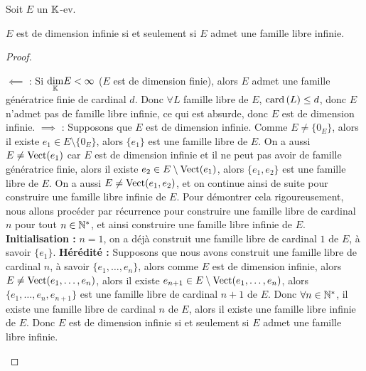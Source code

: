 \documentclass[12pt, a4paper]{report}
\begin{document}
\begin{property}
    Soit $E$ un $\mathbb{K}$-ev.

    $E$ est de dimension infinie si et seulement si $E$ admet une famille libre infinie.
\end{property}

\begin{proof}
    \begin{outline}
        \1 $\impliedby$ : Si $\underset{\mathbb{K}}\dim E < \infty$ ($E$ est de dimension finie), alors $E$ admet une famille génératrice finie de cardinal $d$. Donc $\forall L$ famille libre de $E$, $\mathrm{card}\left(L\right) \le d$, donc $E$ n'admet pas de famille libre infinie, ce qui est absurde, donc $E$ est de dimension infinie.
        \1 $\implies$ : Supposons que $E$ est de dimension infinie.
            \2 Comme $E \ne \{0_E\}$, alors il existe $e_1 \in E\setminus\{0_E\}$, alors $\{e_1\}$ est une famille libre de $E$.
            \2 On a aussi $E \ne \mathrm{Vect}(e_1)$ car $E$ est de dimension infinie et il ne peut pas avoir de famille génératrice finie, alors il existe $e_2 \in E\setminus\mathrm{Vect}(e_1)$, alors $\{e_1,e_2\}$ est une famille libre de $E$.
            \2 On a aussi $E \ne \mathrm{Vect}(e_1,e_2)$, et on continue ainsi de suite pour construire une famille libre infinie de $E$.
            \2 Pour démontrer cela rigoureusement, nous allons procéder par récurrence pour construire une famille libre de cardinal $n$ pour tout $n \in \mathbb{N}^*$, et ainsi construire une famille libre infinie de $E$.
                \3 \textbf{Initialisation :} $n=1$, on a déjà construit une famille libre de cardinal $1$ de $E$, à savoir $\{e_1\}$.
                \3 \textbf{Hérédité :} Supposons que nous avons construit une famille libre de cardinal $n$, à savoir $\{e_1,\dots,e_n\}$, alors comme $E$ est de dimension infinie, alors $E \ne \mathrm{Vect}(e_1,\dots,e_n)$, alors il existe $e_{n+1} \in E\setminus\mathrm{Vect}(e_1,\dots,e_n)$, alors $\{e_1,\dots,e_n,e_{n+1}\}$ est une famille libre de cardinal $n+1$ de $E$.
            \2 Donc $\forall n \in \mathbb{N}^*$, il existe une famille libre de cardinal $n$ de $E$, alors il existe une famille libre infinie de $E$.
        \1 Donc $E$ est de dimension infinie si et seulement si $E$ admet une famille libre infinie.
    \end{outline}
\end{proof}
\end{document}
